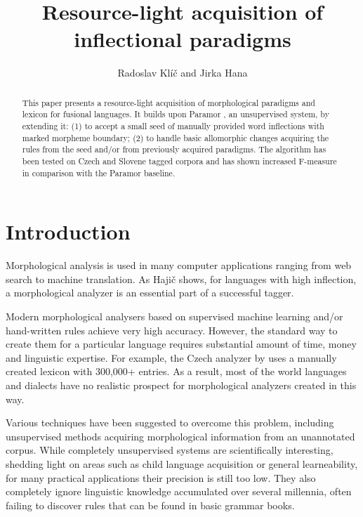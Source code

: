 \documentclass{itatnew}
\newcommand{\todo}[1]{[\textbf{TODO} #1]}
\begin{document}
\title{Resource-light acquisition of inflectional paradigms}

\author{Radoslav Klíč and Jirka Hana}


\maketitle              %

\begin{abstract}
This paper presents a resource-light acquisition of morphological paradigms and lexicon for fusional languages. It builds upon Paramor \cite{monson09}, an unsupervised system, by extending it: 
%
(1) to accept a small seed of manually provided word inflections with marked morpheme boundary;
%
(2) to handle basic allomorphic changes acquiring the rules from the seed and/or from previously acquired paradigms.
The algorithm has been tested on Czech and Slovene tagged corpora and has shown increased F-measure in comparison with the Paramor baseline.
\end{abstract}
\section{Introduction}

Morphological analysis is used in many computer applications ranging from web search to machine translation. As Hajič \cite{hajic-2000-naacl} shows, for languages with high inflection, a morphological analyzer is an essential part of a successful tagger.

Modern morphological analysers based on supervised machine learning and/or hand-written rules achieve very high accuracy. However, the standard way to create them for a particular language requires substantial amount of time, money and linguistic expertise. For example, the Czech analyzer by \cite{hajic-2004-hab} uses a manually created lexicon with 300,000+ entries. As a result, most of the world languages and dialects have no realistic prospect for morphological analyzers created in this way.

Various techniques have been suggested to overcome this problem, including unsupervised methods acquiring morphological information from an unannotated corpus. While completely unsupervised systems are scientifically interesting, shedding light on areas such as child language acquisition or general learneability, for many practical applications their precision is still too low.  They also completely ignore linguistic knowledge accumulated over several millennia, often failing to discover rules that can be found in basic grammar books.
\end{document}
